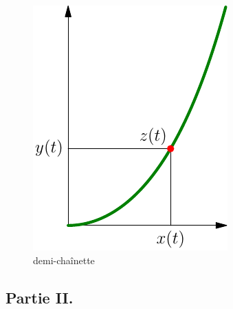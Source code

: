 \begin{figure}[h]
  \centering
  \includegraphics{./Celem18_1.pdf}
  \caption{demi-chaînette}
  \label{fig: Celem18_1}
\end{figure}


\subsection*{Partie II.}

